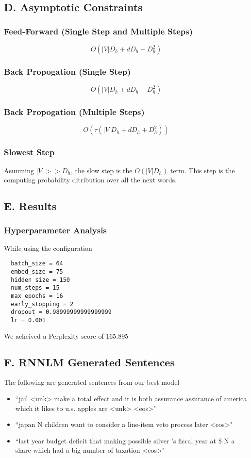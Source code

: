 \documentclass{article}
\begin{document}
\subsection*{D. Asymptotic Constraints}
\subsubsection*{Feed-Forward (Single Step and Multiple Steps)}
$$O(|V|D_h + dD_h+D_h^{2})$$

\subsubsection*{Back Propogation (Single Step)}
$$O(|V|D_h + dD_h+D_h^{2})$$

\subsubsection*{Back Propogation (Multiple Steps)}
$$O(\tau(|V|D_h + dD_h+D_h^{2}))$$

\subsubsection*{Slowest Step}
Asuuming $|V| >> D_h$, the slow step is the $O(|V|D_h)$ term. This step is the computing probability ditribution over all the next words.


\subsection*{E. Results}
\subsubsection*{Hyperparameter Analysis}
While using the configuration
\begin{lstlisting}
  batch_size = 64
  embed_size = 75
  hidden_size = 150
  num_steps = 15
  max_epochs = 16
  early_stopping = 2
  dropout = 0.98999999999999999
  lr = 0.001
\end{lstlisting}

We acheived a Perplexity score of $165.895$

\subsection*{F. \textbf{RNNLM} Generated Sentences }
The following are generated sentences from our best model
\begin{itemize}
\item ``jail <unk> make a total effect and it is both assurance assurance of america which it likes to u.s. apples are <unk> <eos>"
\item ``japan N children want to consider a line-item veto process later <eos>"
\item ``last year budget deficit that making possible silver 's fiscal year at \$ N a share which had a big number of taxation <eos>"
\end{itemize}
\end{document}
